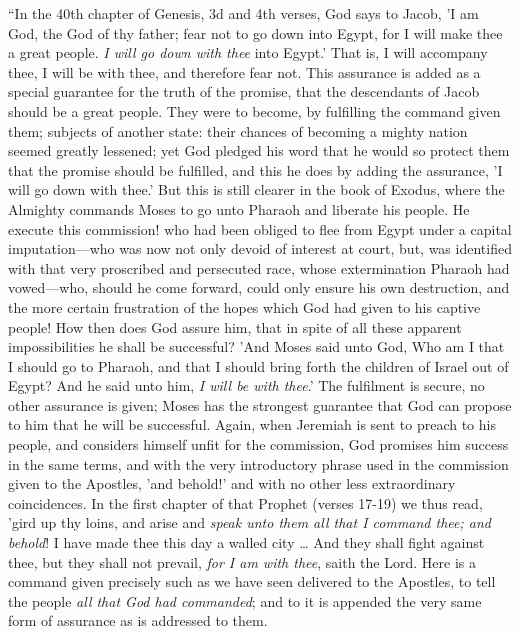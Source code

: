 ``In
the 40th chapter of Genesis, 3d and 4th verses, God says to Jacob, 'I
am God, the God of thy father; fear not to go down into Egypt,
for I will make thee a great people. \emph{I will go down with thee}
into Egypt.' That is, I will accompany thee, I will be with thee, and
therefore fear not. This assurance is added as a special guarantee for
the truth of the promise, that the descendants of Jacob should be a
great people. They were to become, by fulfilling the command given them;
subjects of another state: their chances of becoming a mighty nation
seemed greatly lessened; yet God pledged his word that he would so
protect them that the promise should be fulfilled, and this he does by
adding the assurance, 'I will go down with thee.' But this is still
clearer in the book of Exodus, where the Almighty commands Moses to go
unto Pharaoh and liberate his people. He execute this commission! who
had been obliged to flee from Egypt under a capital imputation—who was
now not only devoid of interest at court, but, was identified with that
very proscribed and persecuted race, whose extermination Pharaoh had
vowed—who, should he come forward, could only ensure his own
destruction, and the more certain frustration of the hopes which God had
given to his captive people! How then does God assure him, that in spite
of all these apparent impossibilities he shall be successful? 'And
Moses said unto God, Who am I that I should go to Pharaoh, and that I
should bring forth the children of Israel out of Egypt? And he said unto
him, \emph{I will be with thee}.' The fulfilment is secure, no other
assurance is given; Moses has the strongest guarantee that God can
propose to him that he will be successful. Again, when Jeremiah is sent
to preach to his people, and considers himself unfit for the commission,
God promises him success in the same terms, and with the very
introductory phrase used in the commission given to the Apostles, 'and
behold!' and with no other less extraordinary coincidences. In the
first chapter of that Prophet (verses 17-19) we thus read, 'gird up
thy loins, and arise and \emph{speak unto them all that I command thee; and
behold}! I have made thee this day a walled city … And they shall
fight against thee, but they shall not prevail, \emph{for I am with thee},
saith the Lord. Here is a command given precisely such as we have seen
delivered to the Apostles, to tell the people \emph{all that God had
commanded}; and to it is appended the very same form of assurance as
is addressed to them.

